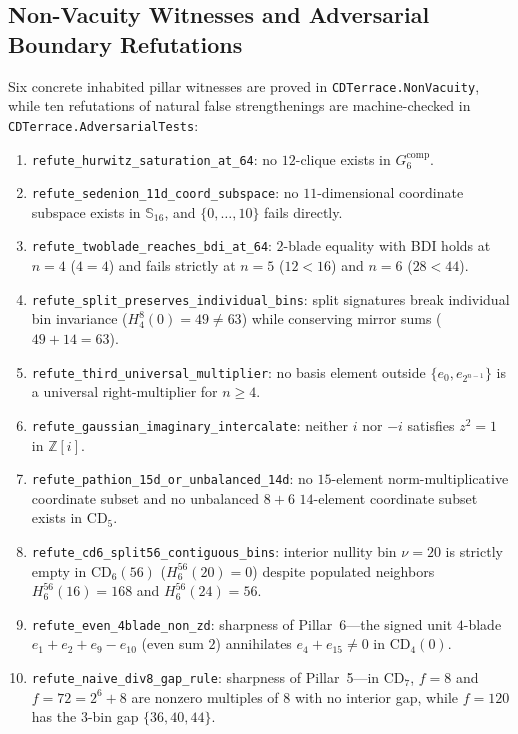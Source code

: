 \documentclass[11pt,reqno]{amsart}
\newcommand{\code}[1]{\textnormal{\texttt{\small\nolinkurl{#1}}}}
\theoremstyle{plain}
\theoremstyle{definition}
\theoremstyle{remark}
\newcommand{\CD}{\mathrm{CD}}
\newcommand{\SSed}{\mathbb{S}_{16}}
\newcommand{\Z}{\mathbb{Z}}
\newcommand{\comp}{\mathrm{comp}}
\begin{document}
\subsection{Non-Vacuity Witnesses and Adversarial Boundary Refutations}
Six concrete inhabited pillar witnesses are proved in \code{CDTerrace.NonVacuity}, while
ten refutations of natural false strengthenings are machine-checked in
\code{CDTerrace.AdversarialTests}:
\begin{enumerate}[leftmargin=2em]
  \item \code{refute_hurwitz_saturation_at_64}: no $12$-clique exists in $G_6^{\comp}$.
  \item \code{refute_sedenion_11d_coord_subspace}: no $11$-dimensional coordinate subspace exists
    in $\SSed$, and $\{0,\dots,10\}$ fails directly.
  \item \code{refute_twoblade_reaches_bdi_at_64}: $2$-blade equality with BDI holds at $n = 4$
    ($4 = 4$) and fails strictly at $n = 5$ ($12 < 16$) and $n = 6$ ($28 < 44$).
  \item \code{refute_split_preserves_individual_bins}: split signatures break individual bin
    invariance ($H_4^{8}(0) = 49 \neq 63$) while conserving mirror sums ($49 + 14 = 63$).
  \item \code{refute_third_universal_multiplier}: no basis element outside $\{e_0, e_{2^{n-1}}\}$
    is a universal right-multiplier for $n \ge 4$.
  \item \code{refute_gaussian_imaginary_intercalate}: neither $i$ nor $-i$ satisfies $z^2 = 1$
    in $\Z[i]$.
  \item \code{refute_pathion_15d_or_unbalanced_14d}: no $15$-element norm-multiplicative
    coordinate subset and no unbalanced $8+6$ $14$-element coordinate subset exists in $\CD_5$.
  \item \code{refute_cd6_split56_contiguous_bins}: interior nullity bin $\nu = 20$ is strictly
    empty in $\CD_6(56)$ ($H_6^{56}(20) = 0$) despite populated neighbors $H_6^{56}(16) = 168$
    and $H_6^{56}(24) = 56$.
  \item \code{refute_even_4blade_non_zd}: sharpness of Pillar~6---the signed unit $4$-blade
    $e_1 + e_2 + e_9 - e_{10}$ (even sum $2$) annihilates $e_4 + e_{15} \neq 0$ in $\CD_4(0)$.
  \item \code{refute_naive_div8_gap_rule}: sharpness of Pillar~5---in $\CD_7$, $f = 8$ and
    $f = 72 = 2^6 + 8$ are nonzero multiples of $8$ with no interior gap, while $f = 120$ has
    the $3$-bin gap $\{36, 40, 44\}$.
\end{enumerate}
\end{document}
